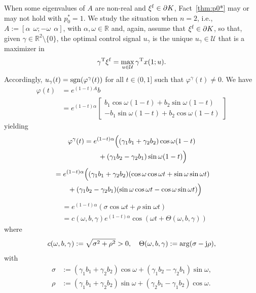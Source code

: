 \documentclass[letterpaper,10pt,conference]{ieeeconf}
\def\R{{\mathbb{R}}}
\begin{document}
When some eigenvalues of $A$ are non-real and $\xi^{\rm f}\in\partial K$,
Fact~\ref{thm:p0*} may or may not hold with $p_0^*=1$.
We study the 
situation when $n=2$, i.e., $A:=[\alpha~~\omega;-\omega~~\alpha]$, 
with $\alpha,\omega\in\R$ and, again, assume that $\xi^{\rm f}\in\partial K$,
so that, given $\gamma\in\R^2\setminus\{0\}$, the optimal control
signal $u_\gamma$ is the unique $u_\gamma\in\mathcal U$ that is a maximizer 
in
\[
\gamma^{\rm T}\xi^{\rm f} = \max_{u\in\mathcal U}\gamma^{\rm T} x(1;u).
\]
Accordingly,
$ u_\gamma(t)={\rm sgn}(\varphi^\gamma(t))$ for all $t\in(0,1]$ such
that $\varphi^\gamma(t)\not=0$. 
We have
\begin{equation}
\label{eqn:varphi(t)}
\begin{aligned}
\varphi(t)&=e^{(1-t)A}b \\
&= e^{(1-t)\alpha}
\begin{bmatrix}
b_1\cos\omega(1-t)+b_2\sin\omega(1-t) \\
-b_1\sin\omega(1-t)+b_2\cos\omega(1-t)
\end{bmatrix}
\end{aligned}
\end{equation}
yielding %
\begin{equation}
\label{eq:varphiGamma(t)}
\begin{aligned}
\varphi^\gamma(t) &= e^{(1-t)\alpha}\Bigl(
(\gamma_1b_1+\gamma_2b_2)\cos\omega(1-t)\\
&\qquad +(\gamma_1b_2-\gamma_2b_1)\sin\omega(1-t)
\Bigr)
\end{aligned}
\end{equation}
\[
\begin{aligned}
&=e^{(1-t)\alpha}\Bigl(
(\gamma_1b_1+\gamma_2b_2)(\cos\omega\cos\omega t+\sin\omega\sin\omega t)\\
&\qquad +
(\gamma_1b_2-\gamma_2b_1)(\sin\omega\cos\omega t-\cos\omega\sin\omega t)
\Bigr)
\end{aligned}
\]
\[
\begin{aligned}
&= e^{(1-t)\alpha} (\sigma\cos\omega t + \rho\sin\omega t)\\
&= c(\omega,b,\gamma) e^{(1-t)\alpha}\cos(\omega t+\Theta(\omega,b,\gamma))
\end{aligned}
\]
where
\[
c(\omega,b,\gamma):=\sqrt{\sigma^2+\rho^2}>0, 
\quad \Theta(\omega,b,\gamma):=\arg(\sigma-{\rm j}\rho) ,
\]
with
\[
\begin{aligned}
\sigma&:=(\gamma_1b_1+\gamma_2b_2)\cos\omega+(\gamma_1b_2-\gamma_2b_1)\sin\omega,\\
\rho&:=(\gamma_1b_1+\gamma_2b_2)\sin\omega+(\gamma_2b_1-\gamma_1b_2)\cos\omega.
\end{aligned}
\]
\end{document}
